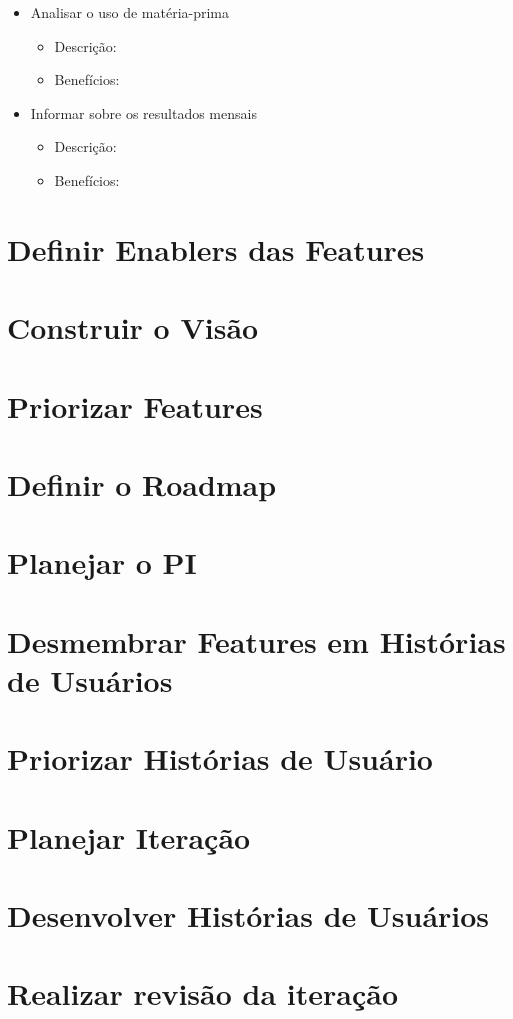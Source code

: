 \begin{itemize}

\item Analisar o uso de matéria-prima
\begin{itemize}
	\item Descrição:
	\item Benefícios:
\end{itemize}

\item Informar sobre os resultados mensais
\begin{itemize}
	\item Descrição:
	\item Benefícios:
\end{itemize}

\end{itemize}

\section{Definir Enablers das Features}

\section{Construir o Visão}

\section{Priorizar Features}

\section{Definir o Roadmap}

\section{Planejar o PI}

\section{Desmembrar Features em Histórias de Usuários}

\section{Priorizar Histórias de Usuário}

\section{Planejar Iteração}

\section{Desenvolver Histórias de Usuários}

\section{Realizar revisão da iteração}
